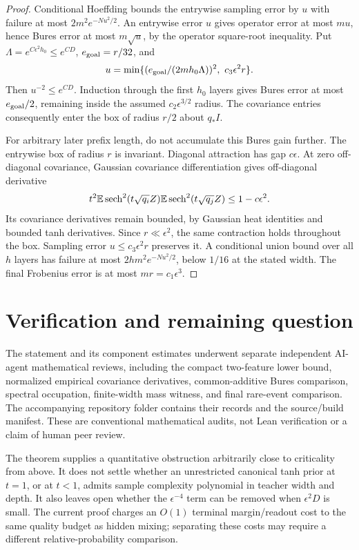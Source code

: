 \documentclass[11pt]{article}
\begin{document}
\begin{proof}
Conditional Hoeffding bounds the entrywise sampling error by $u$ with failure at most $2m^2e^{-Nu^2/2}$. An entrywise error $u$ gives operator error at most $mu$, hence Bures error at most $m\sqrt u$, by the operator square-root inequality. Put $\Lambda=e^{C\epsilon^2h_0}\le e^{CD}$, $e_{\rm goal}=r/32$, and
\[
 u=\min\{(e_{\rm goal}/(2mh_0\Lambda))^2,\ c_3\epsilon^2r\}.
\]
Then $u^{-2}\le e^{CD}$. Induction through the first $h_0$ layers gives Bures error at most $e_{\rm goal}/2$, remaining inside the assumed $c_2\epsilon^{3/2}$ radius. The covariance entries consequently enter the box of radius $r/2$ about $q_*I$.

For arbitrary later prefix length, do not accumulate this Bures gain further. The entrywise box of radius $r$ is invariant. Diagonal attraction has gap $c\epsilon$. At zero off-diagonal covariance, Gaussian covariance differentiation gives off-diagonal derivative
\[
 t^2\mathbb E\operatorname{sech}^2(t\sqrt{q_i}Z)\mathbb E\operatorname{sech}^2(t\sqrt{q_j}Z)
 \le1-c\epsilon^2.
\]
Its covariance derivatives remain bounded, by Gaussian heat identities and bounded tanh derivatives. Since $r\ll\epsilon^2$, the same contraction holds throughout the box. Sampling error $u\le c_3\epsilon^2r$ preserves it. A conditional union bound over all $h$ layers has failure at most $2hm^2e^{-Nu^2/2}$, below $1/16$ at the stated width. The final Frobenius error is at most $mr=c_1\epsilon^3$.
\end{proof}

\section{Verification and remaining question}
The statement and its component estimates underwent separate independent AI-agent mathematical reviews, including the compact two-feature lower bound, normalized empirical covariance derivatives, common-additive Bures comparison, spectral occupation, finite-width mass witness, and final rare-event comparison. The accompanying repository folder contains their records and the source/build manifest. These are conventional mathematical audits, not Lean verification or a claim of human peer review.

The theorem supplies a quantitative obstruction arbitrarily close to criticality from above. It does not settle whether an unrestricted canonical tanh prior at $t=1$, or at $t<1$, admits sample complexity polynomial in teacher width and depth. It also leaves open whether the $\epsilon^{-4}$ term can be removed when $\epsilon^2D$ is small. The current proof charges an $O(1)$ terminal margin/readout cost to the same quality budget as hidden mixing; separating these costs may require a different relative-probability comparison.
\end{document}
